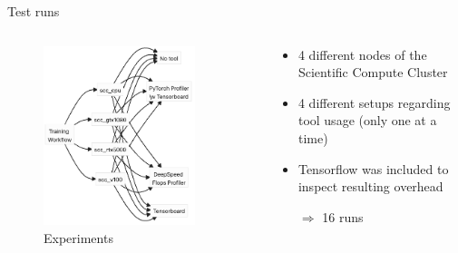 \documentclass[compress,aspectratio=169]{beamer}
\begin{document}
\begin{frame}{Test runs}
\begin{columns}
        \begin{column}{0.5\textwidth}
            \centering
            \vspace{-1em}
            \begin{figure}
            \includegraphics[width=0.85\textwidth]{../../data/runs.png}
            \caption*{Experiments}
            \end{figure}
        \end{column}
        \begin{column}{0.5\textwidth}
            \begin{itemize}
                \item 4 different nodes of the Scientific Compute Cluster
                \item 4 different setups regarding tool usage (only one at a time)
                \item Tensorflow was included to inspect resulting overhead
                \item[$\Rightarrow$] 16 runs
            \end{itemize}
        \end{column}
    \end{columns}

\end{frame}
\end{document}
